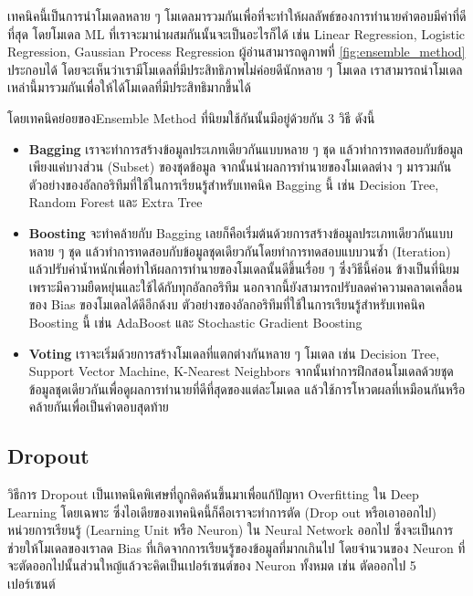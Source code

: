 เทคนิคนี้เป็นการนำโมเดลหลาย ๆ โมเดลมารวมกันเพื่อที่จะทำให้ผลลัพธ์ของการทำนายคำตอบมีค่าที่ดีที่สุด โดยโมเดล ML ที่เราจะมานำผสมกันนั้นจะเป็นอะไรก็ได้ เช่น Linear Regression, Logistic Regression, Gaussian Process Regression ผู้อ่านสามารถดูภาพที่ 
\ref{fig:ensemble_method} ประกอบได้ โดยจะเห็นว่าเรามีโมเดลที่มีประสิทธิภาพไม่ค่อยดีนักหลาย ๆ โมเดล เราสามารถนำโมเดลเหล่านี้มารวมกันเพื่อให้ได้โมเดลที่มีประสิทธิมากขึ้นได้

โดยเทคนิคย่อยของEnsemble Method ที่นิยมใช้กันนั้นมีอยู่ด้วยกัน 3 วิธี ดังนี้
%
\begin{itemize}[topsep=0pt,noitemsep]\setlength\itemsep{0.5em}
    \item \textbf{Bagging} เราจะทำการสร้างข้อมูลประเภทเดียวกันแบบหลาย ๆ ชุด แล้วทำการทดสอบกับข้อมูลเพียงแค่บางส่วน (Subset) 
    ของชุดข้อมูล จากนั้นนำผลการทำนายของโมเดลต่าง ๆ มารวมกัน ตัวอย่างของอัลกอริทึมที่ใช้ในการเรียนรู้สำหรับเทคนิค Bagging นี้ เช่น 
    Decision Tree, Random Forest และ Extra Tree

    \item \textbf{Boosting} จะทำคล้ายกับ Bagging เลยก็คือเริ่มต้นด้วยการสร้างข้อมูลประเภทเดียวกันแบบหลาย ๆ ชุด แล้วทำการทดสอบกับข้อมูลชุดเดียวกันโดยทำการทดสอบแบบวนซ้ำ (Iteration) แล้วปรับค่าน้ำหนักเพื่อทำให้ผลการทำนายของโมเดลนั้นดีขึ้นเรื่อย ๆ ซึ่งวิธีนี้ค่อน    ข้างเป็นที่นิยมเพราะมีความยืดหยุ่นและใช้ได้กับทุกอัลกอริทึม นอกจากนี้ยังสามารถปรับลดค่าความคลาดเคลื่อนของ Bias ของโมเดลได้ดีอีกด้งบ 
    ตัวอย่างของอัลกอริทึมที่ใช้ในการเรียนรู้สำหรับเทคนิค Boosting นี้ เช่น AdaBoost และ Stochastic Gradient Boosting

    \item \textbf{Voting} เราจะเริ่มด้วยการสร้างโมเดลที่แตกต่างกันหลาย ๆ โมเดล เช่น Decision Tree, Support Vector Machine, 
    K-Nearest Neighbors จากนั้นทำการฝึกสอนโมเดลด้วยชุดข้อมูลชุดเดียวกันเพื่อดูผลการทำนายที่ดีที่สุดของแต่ละโมเดล แล้วใช้การโหวตผลที่เหมือนกันหรือคล้ายกันเพื่อเป็นคำตอบสุดท้าย
\end{itemize}

\subsection{Dropout}
\label{ssec:dropout}

วิธีการ Dropout เป็นเทคนิคพิเศษที่ถูกคิดค้นขึ้นมาเพื่อแก้ปัญหา Overfitting ใน Deep Learning โดยเฉพาะ ซึ่งไอเดียของเทคนิคนี้ก็คือเราจะทำการตัด (Drop out หรือเอาออกไป) หน่วยการเรียนรู้ (Learning Unit หรือ Neuron) ใน Neural Network ออกไป ซึ่งจะเป็นการช่วยให้โมเดลของเราลด Bias ที่เกิดจากการเรียนรู้ของข้อมูลที่มากเกินไป โดยจำนวนของ Neuron ที่จะตัดออกไปนั้นส่วนใหญ้แล้วจะคิดเป็นเปอร์เซนต์ของ
Neuron ทั้งหมด เช่น ตัดออกไป 5 เปอร์เซนต์

